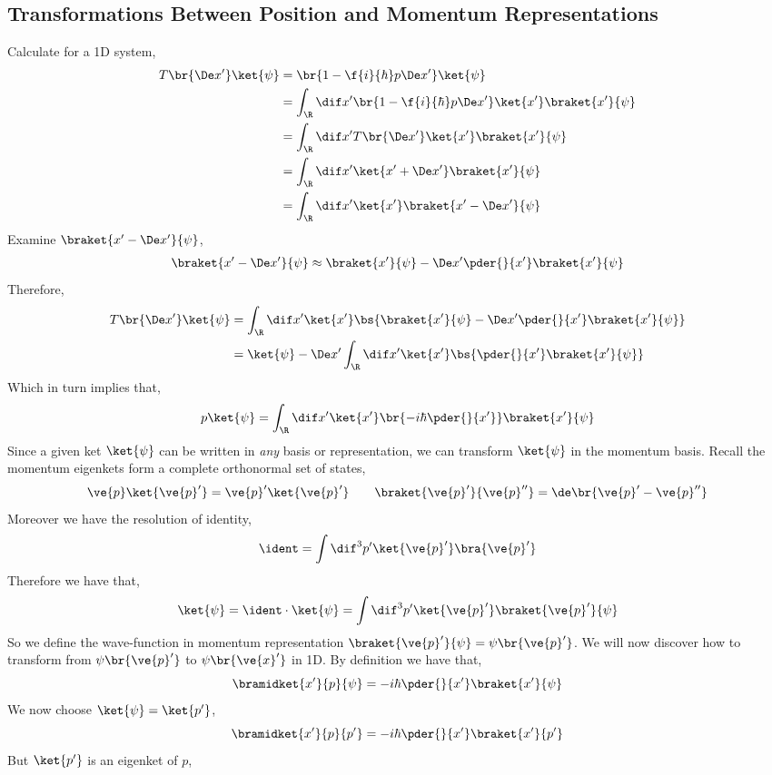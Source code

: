 \documentclass{article}
\begin{document}
\subsection{Transformations Between Position and Momentum Representations}
Calculate for a 1D system,
\begin{align*}
    T\br{\De x'}\ket{\psi} &= \br{1 - \f{i}{\hbar} p \De x'}\ket{\psi}\\
    &= \int_{\R} \dif x' \br{1 - \f{i}{\hbar} p \De x'}\ket{x'}\braket{x'}{\psi}\\
    &= \int_{\R} \dif x' T\br{\De x'}\ket{x'}\braket{x'}{\psi}\\
    &= \int_{\R} \dif x'\ket{x' + \De x'}\braket{x'}{\psi}\\
    &= \int_{\R} \dif x'\ket{x'}\braket{x' - \De x'}{\psi}
\end{align*}
Examine $\braket{x' - \De x'}{\psi}$,
\begin{align*}
    \braket{x' - \De x'}{\psi} \approx \braket{x'}{\psi} - \De x' \pder{}{x'}\braket{x'}{\psi}
\end{align*}
Therefore,
\begin{align*}
    T\br{\De x'}\ket{\psi} &= \int_{\R} \dif x'\ket{x'}\bs{\braket{x'}{\psi} - \De x' \pder{}{x'}\braket{x'}{\psi}} \\
    &= \ket{\psi} - \De x' \int_{\R} \dif x'\ket{x'}\bs{ \pder{}{x'}\braket{x'}{\psi}} \\
\end{align*}
Which in turn implies that,
\[ p \ket{\psi} = \int_{\R} \dif x'\ket{x'}\br{-i\hbar \pder{}{x'}}\braket{x'}{\psi} \]
Since a given ket $\ket{\psi}$ can be written in \textit{any} basis or representation, we can transform $\ket{\psi}$ in the momentum basis. Recall the momentum eigenkets form a complete orthonormal set of states,
\[ \ve{p} \ket{\ve{p}'} = \ve{p}'\ket{\ve{p}'} \qquad \braket{\ve{p}'}{\ve{p}''} = \de\br{\ve{p}' - \ve{p}''} \]
Moreover we have the resolution of identity,
\[ \ident = \int \dif^3 p' \ket{\ve{p}'}\bra{\ve{p}'} \]
Therefore we have that,
\[ \ket{\psi} = \ident \cdot \ket{\psi} = \int \dif^3 p' \ket{\ve{p}'}\braket{\ve{p}'}{\psi} \]
So we define the wave-function in momentum representation $\braket{\ve{p}'}{\psi} = \psi\br{\ve{p}'}$. We will now discover how to transform from $\psi\br{\ve{p}'}$ to $\psi\br{\ve{x}'}$ in 1D. By definition we have that,
\[ \bramidket{x'}{p}{\psi} = - i \hbar \pder{}{x'} \braket{x'}{\psi} \]
We now choose $\ket{\psi} = \ket{p'}$,
\[ \bramidket{x'}{p}{p'} = - i \hbar \pder{}{x'} \braket{x'}{p'} \]
But $\ket{p'}$ is an eigenket of $p$,
\end{document}
